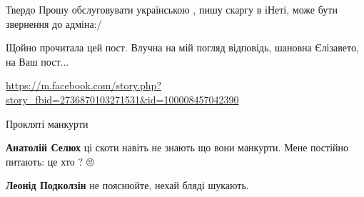 \begin{itemize}
 
Твердо Прошу обслуговувати українською , пишу скаргу в іНеті, може бути звернення до адміна:/

 
Щойно прочитала цей пост. Влучна на мій погляд відповідь, шановна Єлізавето, на Ваш пост... 

\url{https://m.facebook.com/story.php?story_fbid=2736870103271531&id=100008457042390}

 
Прокляті манкурти

\begin{itemize}
 
\textbf{Анатолій Селюх} ці скоти навіть не знають що вони манкурти. Мене постійно питають: це хто ? 🙄

 
\textbf{Леонід Подколзін} не пояснюйте, нехай бляді шукають.
\end{itemize}

 

\end{itemize}
